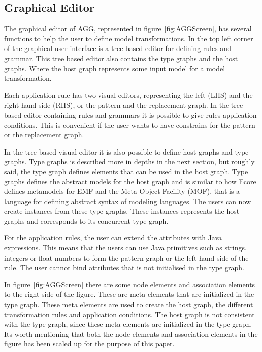 \documentclass[pdftex,11pt,a4paper]{article}
\begin{document}
\subsection{Graphical Editor}
\noindent The graphical editor of AGG, represented in
figure~\ref{fig:AGGScreen}, has several functions to help the user to define
model transformations. In the top left corner of the graphical user-interface
is a tree based editor for defining rules and grammar. This tree based editor
also contains the type graphs and the host graphs. Where the host graph
represents some input model for a model transformation.

Each application rule has two visual editors, representing the left
(LHS) and the right hand side (RHS), or the pattern and the replacement graph.
In the tree based editor containing rules and grammars it is possible to give
rules application conditions. This is convenient if the user wants to have
constrains for the pattern or the replacement graph.

In the tree based visual editor it is also possible to define host
graphs and type graphs. Type graphs is described more in depths in the next
section, but roughly said, the type graph defines elements that can be used in
the host graph. Type graphs defines the abstract models for the host graph and
is similar to how Ecore defines metamodels  for EMF and the Meta Object
Facility (MOF)\cite{MOF}, that is a language for defining abstract syntax of
modeling languages. The users can now create instances from these type graphs.
These instances represents the host graphs and corresponds to its concurrent
type graph.

For the application rules, the user can extend the attributes with Java
expressions. This means that the users can use Java primitives such as strings,
integers or float numbers to form the pattern graph or the left hand side of
the rule. The user cannot bind attributes that is not initialised in the type graph.

In figure~\ref{fig:AGGScreen} there are some node elements and association
elements to the right side of the figure. These are meta elements that are
initialized in the type graph. These meta elements are used to create the host
graph, the different transformation rules and application conditions. The host
graph is not consistent with the type graph, since these meta elements are
initialized in the type graph. Its worth mentioning that both the
node elements and association elements in the figure has been scaled up for the
purpose of this paper.
\end{document}
